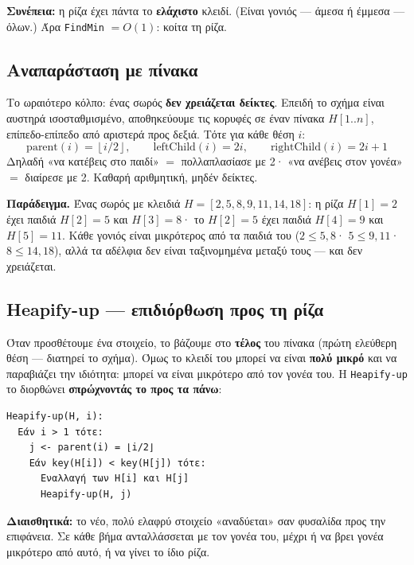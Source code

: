 \documentclass[11pt,a4paper]{article}
\begin{document}
\begin{keypoint}
\textbf{Συνέπεια:} η ρίζα έχει πάντα το \textbf{ελάχιστο} κλειδί. (Είναι γονιός
--- άμεσα ή έμμεσα --- όλων.) Άρα \texttt{FindMin} $= O(1)$: κοίτα τη ρίζα.
\end{keypoint}

\subsection{Αναπαράσταση με πίνακα}

Το ωραιότερο κόλπο: ένας σωρός \textbf{δεν χρειάζεται δείκτες}. Επειδή το σχήμα
είναι αυστηρά ισοσταθμισμένο, αποθηκεύουμε τις κορυφές σε έναν πίνακα $H[1..n]$,
επίπεδο-επίπεδο από αριστερά προς δεξιά. Τότε για κάθε θέση $i$:
\[
\text{parent}(i) = \left\lfloor i/2 \right\rfloor, \qquad
\text{leftChild}(i) = 2i, \qquad
\text{rightChild}(i) = 2i + 1
\]
Δηλαδή «να κατέβεις στο παιδί» $=$ πολλαπλασίασε με 2· «να ανέβεις στον γονέα»
$=$ διαίρεσε με 2. Καθαρή αριθμητική, μηδέν δείκτες.

\textbf{Παράδειγμα.} Ένας σωρός με κλειδιά $H = [2, 5, 8, 9, 11, 14, 18]$: η ρίζα
$H[1] = 2$ έχει παιδιά $H[2] = 5$ και $H[3] = 8$· το $H[2] = 5$ έχει παιδιά
$H[4] = 9$ και $H[5] = 11$. Κάθε γονιός είναι μικρότερος από τα παιδιά του
($2 \le 5, 8$· $5 \le 9, 11$· $8 \le 14, 18$), αλλά τα αδέλφια δεν είναι
ταξινομημένα μεταξύ τους --- και δεν χρειάζεται.

\subsection{Heapify-up --- επιδιόρθωση προς τη ρίζα}

Όταν προσθέτουμε ένα στοιχείο, το βάζουμε στο \textbf{τέλος} του πίνακα (πρώτη
ελεύθερη θέση --- διατηρεί το σχήμα). Όμως το κλειδί του μπορεί να είναι
\textbf{πολύ μικρό} και να παραβιάζει την ιδιότητα: μπορεί να είναι μικρότερο από
τον γονέα του. Η \texttt{Heapify-up} το διορθώνει \textbf{σπρώχνοντάς το προς τα
πάνω}:

\begin{codebox}
\begin{verbatim}
Heapify-up(H, i):
  Εάν i > 1 τότε:
    j <- parent(i) = ⌊i/2⌋
    Εάν key(H[i]) < key(H[j]) τότε:
      Εναλλαγή των H[i] και H[j]
      Heapify-up(H, j)
\end{verbatim}
\end{codebox}

\begin{intuition}
\textbf{Διαισθητικά:} το νέο, πολύ ελαφρύ στοιχείο «αναδύεται» σαν φυσαλίδα προς
την επιφάνεια. Σε κάθε βήμα ανταλλάσσεται με τον γονέα του, μέχρι ή να βρει γονέα
μικρότερο από αυτό, ή να γίνει το ίδιο ρίζα.
\end{intuition}
\end{document}

